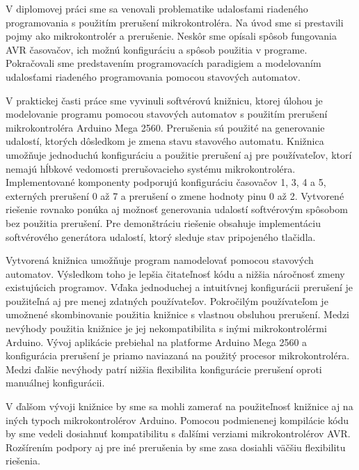 
V diplomovej práci sme sa venovali problematike udalosťami riadeného programovania s použitím prerušení mikrokontroléra. Na úvod sme si prestavili pojmy ako mikrokontrolér
a prerušenie. Neskôr sme opísali spôsob fungovania AVR časovačov, ich možnú konfiguráciu a spôsob použitia v programe. Pokračovali sme predstavením programovacích paradigiem a modelovaním
udalosťami riadeného programovania pomocou stavových automatov. \par
V praktickej časti práce sme vyvinuli softvérovú knižnicu, ktorej úlohou je modelovanie programu pomocou stavových automatov s použitím prerušení mikrokontroléra Arduino
Mega 2560. Prerušenia sú použité na generovanie udalostí, ktorých dôsledkom je zmena stavu stavového automatu. Knižnica umožňuje jednoduchú konfiguráciu a použitie
prerušení aj pre používateľov, ktorí nemajú hĺbkové vedomosti prerušovacieho systému mikrokontroléra. Implementované komponenty podporujú konfiguráciu
časovačov 1, 3, 4 a 5, externých prerušení 0 až 7 a prerušení o zmene hodnoty pinu 0 až 2. Vytvorené riešenie rovnako ponúka aj možnosť generovania
udalostí softvérovým spôsobom bez použitia prerušení. Pre demonštráciu riešenie obsahuje implementáciu softvérového generátora udalostí, ktorý sleduje stav pripojeného
tlačidla.
\par
Vytvorená knižnica umožňuje program namodelovať pomocou stavových automatov. Výsledkom toho je lepšia čitateľnosť kódu a nižšia náročnosť zmeny existujúcich programov.
Vďaka jednoduchej a intuitívnej konfigurácii prerušení je použiteľná aj pre menej zdatných používateľov. Pokročilým používateľom je umožnené skombinovanie použitia
knižnice s vlastnou obsluhou prerušení. Medzi nevýhody použitia knižnice je jej nekompatibilita s inými mikrokontrolérmi Arduino. Vývoj aplikácie prebiehal na platforme
Arduino Mega 2560 a konfigurácia prerušení je priamo naviazaná na použitý procesor mikrokontroléra. Medzi ďalšie nevýhody patrí nižšia flexibilita konfigurácie
prerušení oproti manuálnej konfigurácii. \par
V ďalšom vývoji knižnice by sme sa mohli zamerať na použiteľnosť knižnice aj na iných typoch mikrokontrolérov Arduino. Pomocou podmienenej kompilácie kódu
by sme vedeli dosiahnuť kompatibilitu s ďalšími verziami mikrokontrolérov AVR. Rozšírením podpory aj pre iné prerušenia by sme zasa dosiahli väčšiu flexibilitu
riešenia.